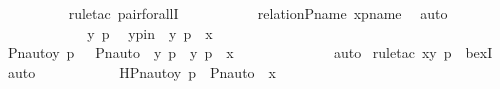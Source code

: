 \begin{isabellebody}
\ \ \ \ \ \ \ \ \isamarkupfalse%
\ {\isacharparenleft}{\kern0pt}rule{\isacharunderscore}{\kern0pt}tac\ pair{\isacharunderscore}{\kern0pt}forallI{\isacharparenright}{\kern0pt}\ \isanewline
\ \ \ \ \ \ \ \ \isamarkupfalse%
\ relation{\isacharunderscore}{\kern0pt}P{\isacharunderscore}{\kern0pt}name\ xpname\ \isamarkupfalse%
\ auto\ \isanewline
\ \ \ \ \ \ \isamarkupfalse%
\ {\isacharminus}{\kern0pt}\ \isanewline
\ \ \ \ \ \ \ \ \isamarkupfalse%
\ y\ p\ \isamarkupfalse%
\ ypin\ {\isacharcolon}{\kern0pt}\ {\isachardoublequoteopen}{\isacharless}{\kern0pt}y{\isacharcomma}{\kern0pt}\ p{\isachargreater}{\kern0pt}\ {\isasymin}\ x{\isachardoublequoteclose}\isanewline
\ \ \ \ \ \ \ \ \isamarkupfalse%
\ \isamarkupfalse%
\ {\isachardoublequoteopen}{\isacharless}{\kern0pt}Pn{\isacharunderscore}{\kern0pt}auto{\isacharparenleft}{\kern0pt}{\isasympi}{\isacharparenright}{\kern0pt}{\isacharbackquote}{\kern0pt}y{\isacharcomma}{\kern0pt}\ {\isasympi}{\isacharbackquote}{\kern0pt}p{\isachargreater}{\kern0pt}\ {\isasymin}\ {\isacharbraceleft}{\kern0pt}\ {\isacharless}{\kern0pt}Pn{\isacharunderscore}{\kern0pt}auto{\isacharparenleft}{\kern0pt}{\isasympi}{\isacharparenright}{\kern0pt}\ {\isacharbackquote}{\kern0pt}\ y{\isacharcomma}{\kern0pt}\ {\isasympi}{\isacharbackquote}{\kern0pt}p{\isachargreater}{\kern0pt}\ {\isachardot}{\kern0pt}\ {\isacharless}{\kern0pt}y{\isacharcomma}{\kern0pt}\ p{\isachargreater}{\kern0pt}\ {\isasymin}\ x\ {\isacharbraceright}{\kern0pt}{\isachardoublequoteclose}\ \isanewline
\ \ \ \ \ \ \ \ \ \ \isamarkupfalse%
\ auto\ \isamarkupfalse%
{\isacharparenleft}{\kern0pt}rule{\isacharunderscore}{\kern0pt}tac\ x{\isacharequal}{\kern0pt}{\isachardoublequoteopen}{\isacharless}{\kern0pt}y{\isacharcomma}{\kern0pt}\ p{\isachargreater}{\kern0pt}{\isachardoublequoteclose}\ \ bexI{\isacharparenright}{\kern0pt}\ \isamarkupfalse%
\ auto\isanewline
\ \ \ \ \ \ \ \ \isamarkupfalse%
\ \isamarkupfalse%
\ H{\isacharcolon}{\kern0pt}{\isachardoublequoteopen}{\isacharless}{\kern0pt}Pn{\isacharunderscore}{\kern0pt}auto{\isacharparenleft}{\kern0pt}{\isasympi}{\isacharparenright}{\kern0pt}{\isacharbackquote}{\kern0pt}y{\isacharcomma}{\kern0pt}\ {\isasympi}{\isacharbackquote}{\kern0pt}p{\isachargreater}{\kern0pt}\ {\isasymin}\ Pn{\isacharunderscore}{\kern0pt}auto{\isacharparenleft}{\kern0pt}{\isasympi}{\isacharparenright}{\kern0pt}\ {\isacharbackquote}{\kern0pt}\ x\ {\isachardoublequoteclose}\ \isanewline

\end{isabellebody}
